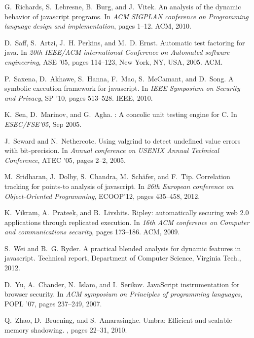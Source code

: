 \documentclass{sig-alternate}
\begin{document}
{\begin{thebibliography}{10}
G.~Richards, S.~Lebresne, B.~Burg, and J.~Vitek.
\newblock An analysis of the dynamic behavior of javascript programs.
\newblock In {\em ACM SIGPLAN conference on Programming language design and
  implementation}, pages 1--12. ACM, 2010.

D.~Saff, S.~Artzi, J.~H. Perkins, and M.~D. Ernst.
\newblock Automatic test factoring for java.
\newblock In {\em 20th IEEE/ACM international Conference on Automated software
  engineering}, ASE '05, pages 114--123, New York, NY, USA, 2005. ACM.

P.~Saxena, D.~Akhawe, S.~Hanna, F.~Mao, S.~McCamant, and D.~Song.
\newblock A symbolic execution framework for javascript.
\newblock In {\em IEEE Symposium on Security and Privacy}, SP '10, pages
  513--528. IEEE, 2010.

K.~Sen, D.~Marinov, and G.~Agha.
: A concolic unit testing engine for {C}.
\newblock In {\em ESEC/FSE'05}, Sep 2005.

J.~Seward and N.~Nethercote.
\newblock Using valgrind to detect undefined value errors with bit-precision.
\newblock In {\em Annual conference on USENIX Annual Technical Conference},
  ATEC '05, pages 2--2, 2005.

M.~Sridharan, J.~Dolby, S.~Chandra, M.~Sch\"{a}fer, and F.~Tip.
\newblock Correlation tracking for points-to analysis of javascript.
\newblock In {\em 26th European conference on Object-Oriented Programming},
  ECOOP'12, pages 435--458, 2012.

K.~Vikram, A.~Prateek, and B.~Livshits.
\newblock Ripley: automatically securing web 2.0 applications through
  replicated execution.
\newblock In {\em 16th ACM conference on Computer and communications security},
  pages 173--186. ACM, 2009.

S.~Wei and B.~G. Ryder.
\newblock A practical blended analysis for dynamic features in javascript.
\newblock Technical report, Department of Computer Science, Virginia Tech.,
  2012.

D.~Yu, A.~Chander, N.~Islam, and I.~Serikov.
\newblock JavaScript instrumentation for browser security.
\newblock In {\em ACM symposium on Principles of programming languages}, POPL
  '07, pages 237--249, 2007.

Q.~Zhao, D.~Bruening, and S.~Amarasinghe.
\newblock Umbra: Efficient and scalable memory shadowing.
, pages 22--31, 2010.

\end{thebibliography}
}
% 
% 
\end{document}

